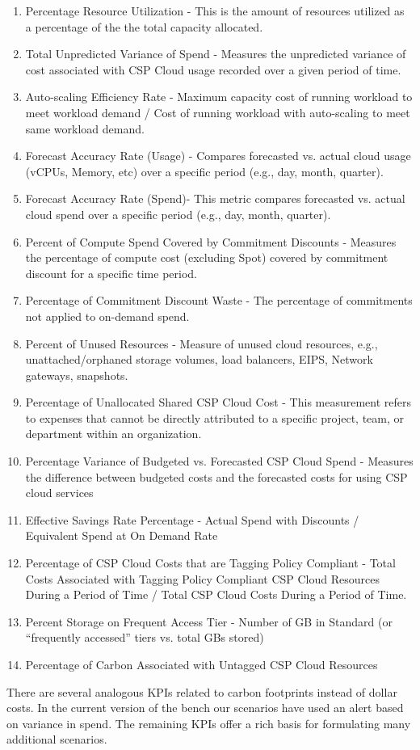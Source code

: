 \begin{enumerate}[labelwidth=*, labelindent=0pt, leftmargin=*, label=(\arabic*),itemsep=0mm]
    \item Percentage Resource Utilization - This is the amount of resources utilized as a percentage of the the total capacity allocated.
    \item Total Unpredicted Variance of Spend - Measures the unpredicted variance of cost associated with CSP Cloud usage recorded over a given period of time.
    \item Auto-scaling Efficiency Rate -  Maximum capacity cost of running workload to meet workload demand / Cost of running workload with auto-scaling to meet same workload demand.
    \item Forecast Accuracy Rate (Usage) - Compares forecasted vs. actual cloud usage (vCPUs, Memory, etc) over a specific period (e.g., day, month, quarter).
    \item Forecast Accuracy Rate (Spend)- This metric compares forecasted vs. actual cloud spend over a specific period (e.g., day, month, quarter).
    \item Percent of Compute Spend Covered by Commitment Discounts - Measures the percentage of compute cost (excluding Spot) covered by commitment discount for a specific time period.
    \item Percentage of Commitment Discount Waste - The percentage of commitments not applied to on-demand spend.
    \item Percent of Unused Resources - Measure of unused cloud resources, e.g., unattached/orphaned storage volumes, load balancers, EIPS, Network gateways, snapshots.
    \item Percentage of Unallocated Shared CSP Cloud Cost - This measurement refers to expenses that cannot be directly attributed to a specific project, team, or department within an organization.
    \item Percentage Variance of Budgeted vs. Forecasted CSP Cloud Spend - Measures the difference between budgeted costs and the forecasted costs for using CSP cloud services
    \item Effective Savings Rate Percentage - Actual Spend with Discounts / Equivalent Spend at On Demand Rate
    \item Percentage of CSP Cloud Costs that are Tagging Policy Compliant - Total Costs Associated with Tagging Policy Compliant CSP Cloud Resources During a Period of Time / Total CSP Cloud Costs During a Period of Time. 
    \item Percent Storage on Frequent Access Tier - Number of GB in Standard (or “frequently accessed” tiers vs. total GBs stored)
    \item Percentage of Carbon Associated with Untagged CSP Cloud Resources
\end{enumerate}
There are several analogous KPIs related to carbon footprints instead of dollar costs. 
In the current version of the bench our scenarios have used an alert based on variance in spend. The remaining KPIs offer a rich basis for formulating many additional scenarios.
